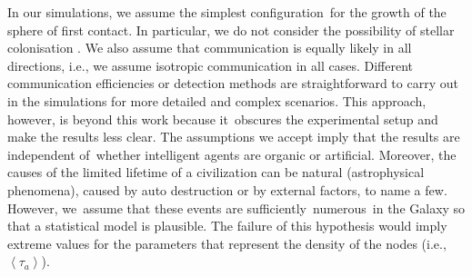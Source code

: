 \documentclass[crop]{CSLB}
\begin{document}
In our simulations, we assume the simplest configuration for the
growth of the sphere of first contact.
%
In particular, we do not consider the
possibility of stellar colonisation
\citep[e.g.][]{newman_galactic_1981, walters_interstellar_1980,
starling_virulence_2013, barlow_galactic_2012, jeong_large_2000,
maccone_mathematical_2011}.
%
We also assume that communication is
equally likely in all directions, i.e., we assume isotropic
communication in all cases.
%
Different communication efficiencies or
detection methods are straightforward to carry out in the simulations
for more detailed and complex scenarios.
%
This approach, however, is
beyond this work because it obscures the experimental setup and make
the results less clear.
%
The assumptions we accept imply that the
results are independent of whether intelligent agents are organic or
artificial. Moreover, the causes of the limited lifetime of a
civilization can be natural (astrophysical phenomena), caused by auto
destruction or by external factors, to name a few. However, we assume
that these events are sufficiently numerous in the Galaxy so that a
statistical model is plausible. The failure of this hypothesis would
imply extreme values for the parameters that represent the density of
the nodes (i.e., $\left< \tau_a \right>$).
\end{document}
